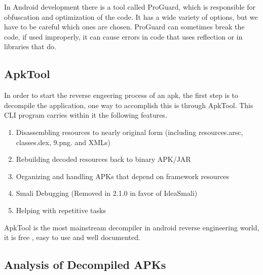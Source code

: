 In Android development there is a tool called ProGuard, which is responsible for obfuscation and optimization of the code. It has a wide variety of options, but we have to be careful which ones are chosen. ProGuard can sometimes break the code, if used improperly, it can cause errors in code that uses reflection or in libraries that do.

\subsection{ApkTool}
In order to start the reverse engeering process of an apk, the first step is to decompile the application, one way to accomplish this is through ApkTool. This CLI program carries within it the following features.
\begin{enumerate}
\item{Disassembling resources to nearly original form (including resources.arsc, classes.dex, 9.png. and XMLs)}
\item{Rebuilding decoded resources back to binary APK/JAR}
\item{Organizing and handling APKs that depend on framework resources}
\item{Smali Debugging (Removed in 2.1.0 in favor of IdeaSmali)}
\item{Helping with repetitive tasks}
\end{enumerate}

ApkTool is the most mainstream decompiler in android reverse engineering world, it is free , easy to use and well documented. 



\subsection{Analysis of Decompiled APKs}


